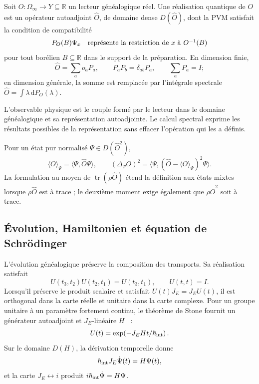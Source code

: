 Soit \(O:\Omega_\infty\to Y\subseteq\mathbb R\) un lecteur généalogique réel. Une réalisation quantique de \(O\) est un opérateur autoadjoint \(\widehat O\), de domaine dense \(D(\widehat O)\), dont la PVM satisfait la condition de compatibilité
\[
 P_O(B)\Psi_x
 \quad\hbox{représente la restriction de \(x\) à \(O^{-1}(B)\)}
\]
pour tout borélien \(B\subseteq\mathbb R\) dans le support de la préparation. En dimension finie,
\[
 \widehat O=\sum_a o_a P_a,
 \qquad
 P_a P_b=\delta_{ab}P_a,
 \qquad
 \sum_a P_a=I;
\]
en dimension générale, la somme est remplacée par l’intégrale spectrale \(\widehat O=\int\lambda\,\mathrm dP_O(\lambda)\).

\begin{principle}
L’observable physique est le couple formé par le lecteur dans le domaine généalogique et sa représentation autoadjointe. Le calcul spectral exprime les résultats possibles de la représentation sans effacer l’opération qui les a définis.
\end{principle}

Pour un état pur normalisé \(\Psi\in D(\widehat O^2)\),
\[
 \langle O\rangle_\Psi
 =\langle\Psi,\widehat O\Psi\rangle,
 \qquad
 (\Delta_\Psi O)^2
 =\langle\Psi,(\widehat O-\langle O\rangle_\Psi)^2\Psi\rangle.
\]
La formulation au moyen de \(\operatorname{tr}(\rho\widehat O)\) étend la définition aux états mixtes lorsque \(\rho\widehat O\) est à trace ; le deuxième moment exige également que \(\rho\widehat O^2\) soit à trace.

\subsection{Évolution, Hamiltonien et équation de Schrödinger}

L’évolution généalogique préserve la composition des transports. Sa
réalisation satisfait
\[
 U(t_3,t_2)U(t_2,t_1)=U(t_3,t_1),
 \qquad U(t,t)=I.
\]
Lorsqu’il préserve le produit scalaire et satisfait
\(U(t)J_E=J_EU(t)\), il est orthogonal dans la carte réelle et unitaire dans la carte
complexe. Pour un groupe unitaire à un paramètre fortement continu, le
théorème de Stone fournit un générateur autoadjoint et \(J_E\)-linéaire
\(H\)~\cite{Stone1932} :
\[
 U(t)=\exp\!\left(-J_E H t/\hbar_{\rm int}\right).
\]
Sur le domaine \(D(H)\), la dérivation temporelle donne
\begin{equation}
 \hbar_{\rm int}J_E\dot\Psi(t)=H\Psi(t),
 \label{eq:schrodinger-genealogico-rev2}
\end{equation}
et la carte \(J_E\leftrightarrow i\) produit
\(i\hbar_{\rm int}\dot\Psi=H\Psi\).

